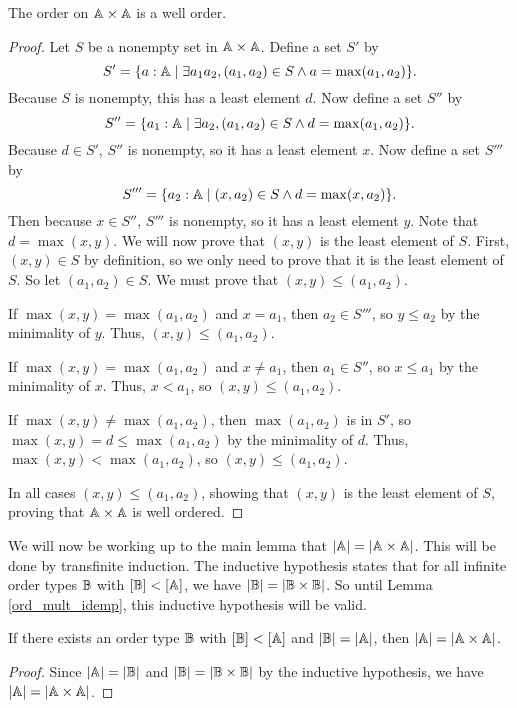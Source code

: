 \documentclass[../../math.tex]{subfiles}
\begin{document}
\begin{instance}
    The order on $\mathbb{A} \times \mathbb{A}$ is a well order.
\end{instance}
\begin{proof}
    Let $S$ be a nonempty set in $\mathbb{A} \times \mathbb{A}$.  Define a set $S'$ by
    \[
        S' = \{a : \mathbb{A} \mid
            \exists a_1 a_2, (a_1, a_2) \in S \wedge a = \max(a_1, a_2)\}.
    \]
    Because $S$ is nonempty, this has a least element $d$.  Now define a set
    $S''$ by
    \[
        S'' = \{a_1 : \mathbb{A} \mid
            \exists a_2, (a_1, a_2) \in S \wedge d = \max(a_1, a_2)\}.
    \]
    Because $d \in S'$, $S''$ is nonempty, so it has a least element $x$.  Now
    define a set $S'''$ by
    \[
        S''' = \{a_2 : \mathbb{A} \mid (x, a_2) \in S \wedge d = \max(x, a_2)\}.
    \]
    Then because $x \in S''$, $S'''$ is nonempty, so it has a least element $y$.
    Note that $d = \max(x, y)$.  We will now prove that $(x, y)$ is the least
    element of $S$.  First, $(x, y) \in S$ by definition, so we only need to
    prove that it is the least element of $S$.  So let $(a_1, a_2) \in S$.  We
    must prove that $(x, y) \leq (a_1, a_2)$.

    If $\max(x, y) = \max(a_1, a_2)$ and $x = a_1$, then $a_2 \in S'''$, so $y
    \leq a_2$ by the minimality of $y$.  Thus, $(x, y) \leq (a_1, a_2)$.

    If $\max(x, y) = \max(a_1, a_2)$ and $x \neq a_1$, then $a_1 \in S''$, so $x
    \leq a_1$ by the minimality of $x$.  Thus, $x < a_1$, so $(x, y) \leq (a_1,
    a_2)$.

    If $\max(x, y) \neq \max(a_1, a_2)$, then $\max(a_1, a_2)$ is in $S'$, so
    $\max(x, y) = d \leq \max(a_1, a_2)$ by the minimality of $d$.  Thus,
    $\max(x, y) < \max(a_1, a_2)$, so $(x, y) \leq (a_1, a_2)$.

    In all cases $(x, y) \leq (a_1, a_2)$, showing that $(x, y)$ is the least
    element of $S$, proving that $\mathbb{A} \times \mathbb{A}$ is well ordered.
\end{proof}

We will now be working up to the main lemma that $|\mathbb{A}| = |\mathbb{A} \times \mathbb{A}|$.  This
will be done by transfinite induction.  The inductive hypothesis states that for
all infinite order types $\mathbb{B}$ with $[\mathbb{B}] < [\mathbb{A}]$, we have $|\mathbb{B}| = |\mathbb{B} \times
\mathbb{B}|$.  So until Lemma \ref{ord_mult_idemp}, this inductive hypothesis will be
valid.

\begin{lemma} \label{not_card_idemp}
    If there exists an order type $\mathbb{B}$ with $[\mathbb{B}] < [\mathbb{A}]$ and $|\mathbb{B}| = |\mathbb{A}|$,
    then $|\mathbb{A}| = |\mathbb{A} \times \mathbb{A}|$.
\end{lemma}
\begin{proof}
    Since $|\mathbb{A}| = |\mathbb{B}|$ and $|\mathbb{B}| = |\mathbb{B} \times \mathbb{B}|$ by the inductive hypothesis,
    we have $|\mathbb{A}| = |\mathbb{A} \times \mathbb{A}|$.
\end{proof}
\end{document}
